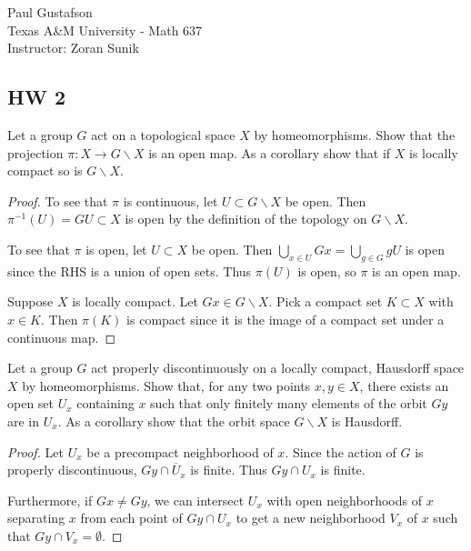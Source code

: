 \documentclass{article}
\begin{document}
\noindent Paul Gustafson\\
\noindent Texas A\&M University - Math 637\\ 
\noindent Instructor: Zoran Sunik

\subsection*{HW 2}
 Let a group $G$ act on a topological space $X$ by homeomorphisms.  Show that the projection $\pi: X \to G \backslash X$ is an open map.
 As a corollary show that  if $X$ is locally compact so is $G \backslash X$.
\begin{proof}
To see that $\pi$ is continuous, let $U \subset G \backslash X$ be open.  Then $\pi^{-1}(U) = GU \subset X$ is open by the definition of the topology on $G \backslash X$.

To see that $\pi$ is open, let $U \subset X$ be open.  Then $\bigcup_{x \in U} Gx = \bigcup_{g \in G} gU$ is open since the RHS is a union of open sets.  Thus $\pi(U)$ is open, so $\pi$ is an open map.

Suppose $X$ is locally compact.  Let $Gx \in G \backslash X$.  Pick a compact set $K \subset X$ with $x \in K$.  Then $\pi(K)$ is compact since it is the image of a compact set under a continuous map. 
\end{proof}

 Let a group $G$ act properly discontinuously on a locally compact, Hausdorff space $X$ by homeomorphisms.  Show that, for any two points $x, y \in X$, there exists an open set $U_x$ containing $x$ such that only finitely many elements of the orbit $Gy$ are in $U_x$.
As a corollary show that the orbit space $G \backslash X$ is Hausdorff.
\begin{proof}
Let $U_x$ be a precompact neighborhood of $x$.   Since the action of $G$ is properly discontinuous, $Gy \cap \overline U_x$ is finite.  Thus $Gy \cap U_x$ is finite. 

Furthermore, if $Gx \neq Gy$, we can intersect $U_x$ with open neighborhoods of $x$ separating $x$ from each point of $Gy \cap U_x$ to get a new neighborhood $V_x$ of $x$ such that $Gy \cap V_x = \emptyset$.

\end{proof}
\end{document}
